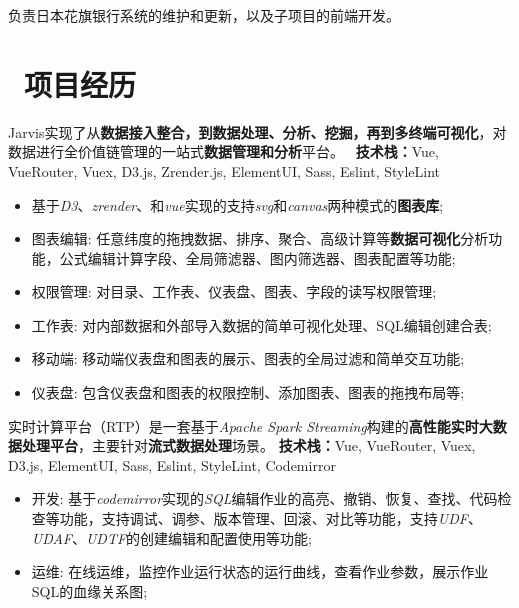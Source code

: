 \documentclass{resume}
\begin{document}
\begin{onehalfspacing}
负责日本花旗银行系统的维护和更新，以及子项目的前端开发。
\end{onehalfspacing}

\section{\faUsers\ 项目经历}

\begin{onehalfspacing}
Jarvis实现了从\textbf{数据接入整合，到数据处理、分析、挖掘，再到多终端可视化}，对数据进行全价值链管理的一站式\textbf{数据管理和分析}平台。
\ \textbf{技术栈：}Vue, VueRouter, Vuex, D3.js, Zrender.js, ElementUI, Sass, Eslint, StyleLint
\begin{itemize}
  \item 基于\textit{D3}、\textit{zrender}、和\textit{vue}实现的支持\textit{svg}和\textit{canvas}两种模式的\textbf{图表库};
  \item 图表编辑: 任意纬度的拖拽数据、排序、聚合、高级计算等\textbf{数据可视化}分析功能，公式编辑计算字段、全局筛滤器、图内筛选器、图表配置等功能;
  \item 权限管理: 对目录、工作表、仪表盘、图表、字段的读写权限管理;
  \item 工作表: 对内部数据和外部导入数据的简单可视化处理、SQL编辑创建合表;
  \item 移动端: 移动端仪表盘和图表的展示、图表的全局过滤和简单交互功能;
  \item 仪表盘: 包含仪表盘和图表的权限控制、添加图表、图表的拖拽布局等;
\end{itemize}
\end{onehalfspacing}

\begin{onehalfspacing}
实时计算平台（RTP）是一套基于\textit{Apache Spark Streaming}构建的\textbf{高性能实时大数据处理平台}，主要针对\textbf{流式数据处理}场景。
\textbf{技术栈：}Vue, VueRouter, Vuex, D3.js, ElementUI, Sass, Eslint, StyleLint, Codemirror
\begin{itemize}
  \item 开发: 基于\textit{codemirror}实现的\textit{SQL}编辑作业的高亮、撤销、恢复、查找、代码检查等功能，支持调试、调参、版本管理、回滚、对比等功能，支持\textit{UDF}、\textit{UDAF}、\textit{UDTF}的创建编辑和配置使用等功能;
  \item 运维: 在线运维，监控作业运行状态的运行曲线，查看作业参数，展示作业SQL的血缘关系图;
\end{itemize}
\end{onehalfspacing}
\end{document}

